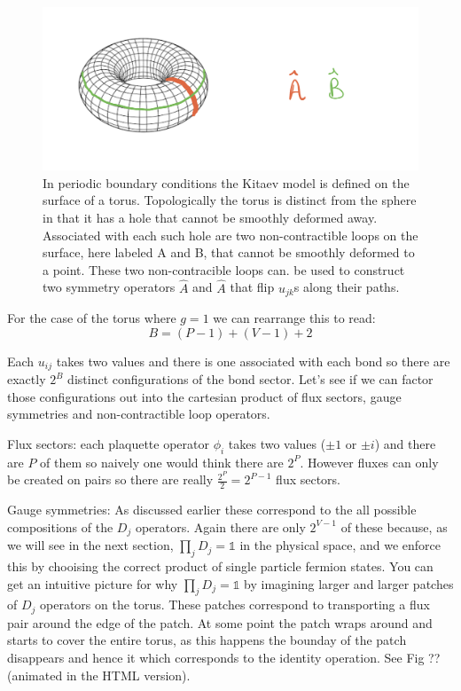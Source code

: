 \begin{figure}
\hypertarget{fig:torus}{%
\centering
\includegraphics{figs/torus.jpeg}
\caption{In periodic boundary conditions the Kitaev model is defined on
the surface of a torus. Topologically the torus is distinct from the
sphere in that it has a hole that cannot be smoothly deformed away.
Associated with each such hole are two non-contractible loops on the
surface, here labeled A and B, that cannot be smoothly deformed to a
point. These two non-contracible loops can. be used to construct two
symmetry operators \(\hat{A}\) and \(\hat{A}\) that flip \(u_{jk}\)s
along their paths.}\label{fig:torus}
}
\end{figure}

For the case of the torus where \(g = 1\) we can rearrange this to read:
\[B = (P-1) + (V-1) + 2\]

Each \(u_{ij}\) takes two values and there is one associated with each
bond so there are exactly \(2^B\) distinct configurations of the bond
sector. Let's see if we can factor those configurations out into the
cartesian product of flux sectors, gauge symmetries and non-contractible
loop operators.

Flux sectors: each plaquette operator \(\phi_i\) takes two values
(\(\pm 1\) or \(\pm i\)) and there are \(P\) of them so naively one
would think there are \(2^P\). However fluxes can only be created on
pairs so there are really \(\tfrac{2^P}{2} = 2^{P-1}\) flux sectors.

Gauge symmetries: As discussed earlier these correspond to the all
possible compositions of the \(D_j\) operators. Again there are only
\(2^{V-1}\) of these because, as we will see in the next section,
\(\prod_{j} D_j = \mathbb{1}\) in the physical space, and we enforce
this by chooising the correct product of single particle fermion states.
You can get an intuitive picture for why \(\prod_{j} D_j = \mathbb{1}\)
by imagining larger and larger patches of \(D_j\) operators on the
torus. These patches correspond to transporting a flux pair around the
edge of the patch. At some point the patch wraps around and starts to
cover the entire torus, as this happens the bounday of the patch
disappears and hence it which corresponds to the identity operation. See
Fig ?? (animated in the HTML version).

